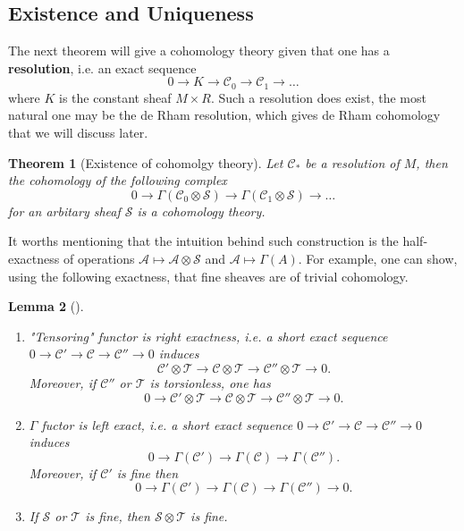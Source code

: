 \documentclass[11pt]{article}
\newtheorem{theorem}{Theorem}
\newtheorem{lemma}[theorem]{Lemma}
\begin{document}
\subsection{Existence and Uniqueness}
\label{sec:orgb23aff9}
The next theorem will give a cohomology theory given that one has a \textbf{resolution}, i.e. an
exact sequence 
\[
0 \longrightarrow K \longrightarrow \mathcal{C}_0 \longrightarrow
\mathcal{C}_1 \longrightarrow \dots 
\] 
where \(K\) is the constant sheaf \(M\times R\). Such a resolution does exist, the most
natural one may be the de Rham resolution, which gives de Rham cohomology that we will
discuss later. 

\begin{theorem}[Existence of cohomolgy theory]
\label{thm:existence-cohomology}
Let \(\mathcal{C}_*\) be a resolution of \(M\), then the cohomology of the following
complex
\[
0 \longrightarrow \Gamma(\mathcal{C}_0 \otimes \mathcal{S}) \longrightarrow
\Gamma(\mathcal{C}_1 \otimes \mathcal{S}) \longrightarrow \dots
\]
for an arbitary sheaf \(\mathcal{S}\) is a cohomology theory.
\end{theorem}

It worths mentioning that the intuition behind such construction is the half-exactness of
operations \(\mathcal{A} \mapsto \mathcal{A}\otimes \mathcal{S}\) and \(\mathcal{A}\mapsto \Gamma(A)\). For example, one can show, using the following exactness,
that fine sheaves are of trivial cohomology.

\begin{lemma}[]
\label{lem:exactness}
\begin{enumerate}
\item "Tensoring" functor is right exactness, i.e. a short exact sequence \(0 \longrightarrow
   \mathcal{C}' \longrightarrow \mathcal{C} \longrightarrow \mathcal{C}'' \longrightarrow
   0\) induces
\[
   \mathcal{C}'\otimes \mathcal{T} \longrightarrow \mathcal{C}\otimes \mathcal{T}
   \longrightarrow \mathcal{C}''\otimes \mathcal{T} \longrightarrow 0.
   \]
Moreover, if \(\mathcal{C}''\) or \(\mathcal{T}\) is torsionless, one has
\[
   0 \longrightarrow \mathcal{C}'\otimes \mathcal{T} \longrightarrow \mathcal{C}\otimes \mathcal{T}
   \longrightarrow \mathcal{C}''\otimes \mathcal{T} \longrightarrow 0.
   \]
\item \(\Gamma\) fuctor is left exact, i.e. a short exact sequence \(0 \longrightarrow
   \mathcal{C}' \longrightarrow \mathcal{C} \longrightarrow \mathcal{C}'' \longrightarrow
   0\) induces
\[
   0 \longrightarrow \Gamma(\mathcal{C}') \longrightarrow \Gamma(\mathcal{C}) \longrightarrow \Gamma(\mathcal{C}'').
   \]
Moreover, if \(\mathcal{C}'\) is fine then
\[
   0 \longrightarrow \Gamma(\mathcal{C}') \longrightarrow \Gamma(\mathcal{C})
   \longrightarrow \Gamma(\mathcal{C}'') \longrightarrow 0.
   \]
\item If \(\mathcal{S}\) or \(\mathcal{T}\) is fine, then \(\mathcal{S}\otimes
   \mathcal{T}\) is fine.
\end{enumerate}
\end{lemma}
\end{document}
